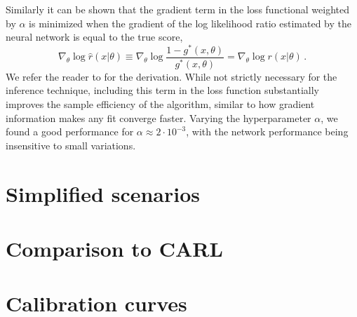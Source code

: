 \documentclass[twocolumn]{aastex62}
\begin{document}
Similarly it can be shown that the gradient term in the loss functional weighted by $\alpha$ is minimized when the gradient of the log likelihood ratio estimated by the neural network is equal to the true score,
%
\begin{equation}
  \nabla_\theta \log \hat{r}(x|\theta) \equiv \nabla_\theta \log \frac {1 - g^*(x, \theta)}{g^*(x, \theta)} = \nabla_\theta \log r(x|\theta) \,.
\end{equation}
%
We refer the reader to \citep{1805.00020} for the derivation. While not strictly necessary for the inference technique, including this term in the loss function substantially improves the sample efficiency of the algorithm, similar to how gradient information makes any fit converge faster. Varying the hyperparameter $\alpha$, we found a good performance for $\alpha \approx 2 \cdot 10^{-3}$, with the network performance being insensitive to small variations.


\section{Simplified scenarios}


\section{Comparison to CARL}


\section{Calibration curves}




\end{document}
